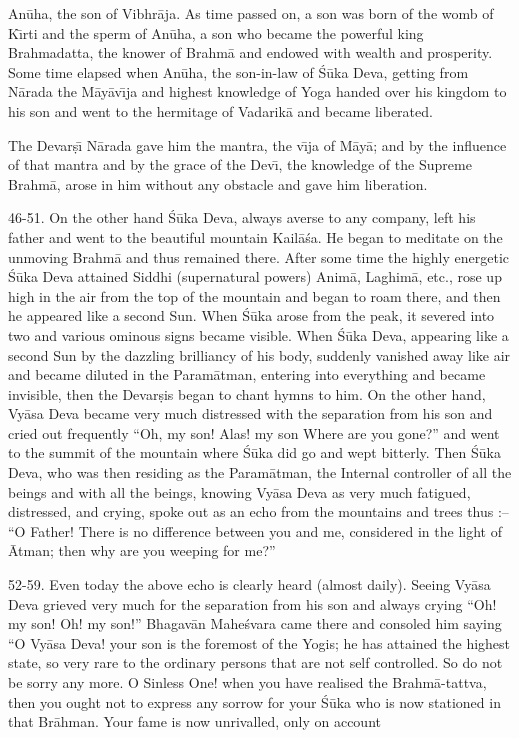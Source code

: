 An\=uha, the son of Vibhr\=aja. As time passed on, a son was born of the womb of K\={\i}rti and the sperm of An\=uha, a son who became the powerful king Brahmadatta, the knower of Brahm\=a and endowed with wealth and prosperity. Some time elapsed when An\=uha, the son-in-law of \'S\=uka Deva, getting from N\=arada the M\=ay\=av\={\i}ja and highest knowledge of Yoga handed over his kingdom to his son and went to the hermitage of Vadarik\=a and became liberated.

The Devar\d{s}\={\i} N\=arada gave him the mantra, the v\={\i}ja of M\=ay\=a; and by the influence of that mantra and by the grace of the Dev\={\i}, the knowledge of the Supreme Brahm\=a, arose in him without any obstacle and gave him liberation.

46-51. On the other hand \'S\=uka Deva, always averse to any company, left his father and went to the beautiful mountain Kail\=a\'sa. He began to meditate on the unmoving Brahm\=a and thus remained there. After some time the highly energetic \'S\=uka Deva attained Siddhi (supernatural powers) Anim\=a, Laghim\=a, etc., rose up high in the air from the top of the mountain and began to roam there, and then he appeared like a second Sun. When \'S\=uka arose from the peak, it severed into two and various ominous signs became visible. When \'S\=uka Deva, appearing like a second Sun by the dazzling brilliancy of his body, suddenly vanished away like air and became diluted in the Param\=atman, entering into everything and became invisible, then the Devar\d{s}is began to chant hymns to him. On the other hand, Vy\=asa Deva became very much distressed with the separation from his son and cried out frequently ``Oh, my son! Alas! my son Where are you gone?'' and went to the summit of the mountain where \'S\=uka did go and wept bitterly. Then \'S\=uka Deva, who was then residing as the Param\=atman, the Internal controller of all the beings and with all the beings, knowing Vy\=asa Deva as very much fatigued, distressed, and crying, spoke out as an echo from the mountains and trees thus :-- ``O Father! There is no difference between you and me, considered in the light of \=Atman; then why are you weeping for me?''

52-59. Even today the above echo is clearly heard (almost daily). Seeing Vy\=asa Deva grieved very much for the separation from his son and always crying ``Oh! my son! Oh! my son!'' Bhagav\=an Mahe\'svara came there and consoled him saying ``O Vy\=asa Deva! your son is the foremost of the Yogis; he has attained the highest state, so very rare to the ordinary persons that are not self controlled. So do not be sorry any more. O Sinless One! when you have realised the Brahm\=a-tattva, then you ought not to express any sorrow for your \'S\=uka who is now stationed in that Br\=ahman. Your fame is now unrivalled, only on account

